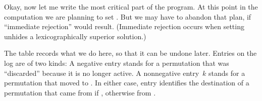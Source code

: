\fi

Okay, now let me write the most critical part of the
program.
At this point in the computation
we are planning to set . But we may have to
abandon that plan, if ``immediate rejection'' would result.
(Immediate rejection occurs when setting  unhides a
lexicographically superior solution.)

The  table records what we do here, so that it can be undone later.
Entries on the log are of two kinds: A negative entry stands for a
permutation that was ``discarded'' because it is no longer active.
A nonnegative entry~$k$ stands for a permutation that moved to .
In either case, entry  identifies the destination of
a permutation that came from  if ,
otherwise from .

